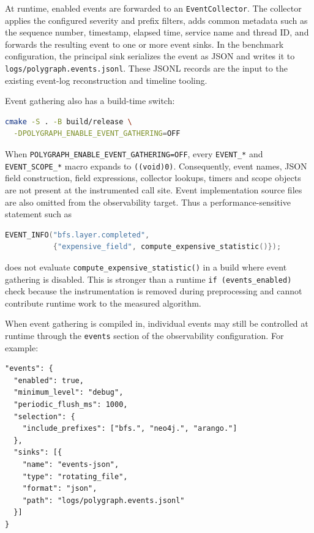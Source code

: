At runtime, enabled events are forwarded to an \texttt{EventCollector}. The
collector applies the configured severity and prefix filters, adds common metadata
such as the sequence number, timestamp, elapsed time, service name and thread ID,
and forwards the resulting event to one or more event sinks. In the benchmark
configuration, the principal sink serializes the event as JSON and writes it to
\texttt{logs/polygraph.events.jsonl}. These JSONL records are the input to the
existing event-log reconstruction and timeline tooling.

Event gathering also has a build-time switch:

\begin{lstlisting}[language=bash]
cmake -S . -B build/release \
  -DPOLYGRAPH_ENABLE_EVENT_GATHERING=OFF
\end{lstlisting}

When \texttt{POLYGRAPH\_ENABLE\_EVENT\_GATHERING=OFF}, every
\texttt{EVENT\_*} and \texttt{EVENT\_SCOPE\_*} macro expands to
\texttt{((void)0)}. Consequently, event names, JSON field construction, field
expressions, collector lookups, timers and scope objects are not present at the
instrumented call site. Event implementation source files are also omitted from
the observability target. Thus a performance-sensitive statement such as

\begin{lstlisting}[language=C++]
EVENT_INFO("bfs.layer.completed",
           {"expensive_field", compute_expensive_statistic()});
\end{lstlisting}

does not evaluate \texttt{compute\_expensive\_statistic()} in a build where event
gathering is disabled. This is stronger than a runtime
\texttt{if (events\_enabled)} check because the instrumentation is removed during
preprocessing and cannot contribute runtime work to the measured algorithm.

When event gathering is compiled in, individual events may still be controlled at
runtime through the \texttt{events} section of the observability configuration.
For example:

\begin{lstlisting}
"events": {
  "enabled": true,
  "minimum_level": "debug",
  "periodic_flush_ms": 1000,
  "selection": {
    "include_prefixes": ["bfs.", "neo4j.", "arango."]
  },
  "sinks": [{
    "name": "events-json",
    "type": "rotating_file",
    "format": "json",
    "path": "logs/polygraph.events.jsonl"
  }]
}
\end{lstlisting}

